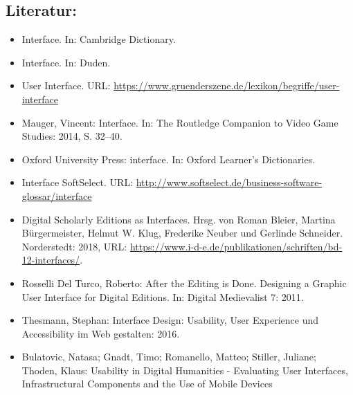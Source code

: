 \documentclass{article}
\begin{document}
        \subsection*{Literatur:}\begin{itemize}\item Interface. In: Cambridge Dictionary.\item Interface. In: Duden.\item User Interface. URL: \url{https://www.gruenderszene.de/lexikon/begriffe/user-interface}\item Mauger, Vincent: Interface. In: The Routledge Companion to Video Game Studies: 2014, S. 32–40.\item Oxford University Press: interface. In: Oxford Learner's Dictionaries.\item Interface SoftSelect. URL: \url{http://www.softselect.de/business-software-glossar/interface}\item Digital Scholarly Editions as Interfaces. Hrsg. von Roman Bleier, Martina Bürgermeister, Helmut W. Klug, Frederike Neuber und Gerlinde Schneider. Norderstedt: 2018, URL: \url{https://www.i-d-e.de/publikationen/schriften/bd-12-interfaces/}.\item Rosselli Del Turco, Roberto: After the Editing is Done. Designing a Graphic User
                              Interface for Digital Editions. In: Digital Medievalist 7: 2011.\item Thesmann, Stephan: Interface Design: Usability, User Experience und
                              Accessibility im Web gestalten: 2016.\item Bulatovic, Natasa; Gnadt, Timo; Romanello, Matteo; Stiller, Juliane; Thoden, Klaus: Usability in Digital Humanities - Evaluating User
                              Interfaces, Infrastructural Components and the Use of Mobile Devices

\end{itemize}
\end{document}
